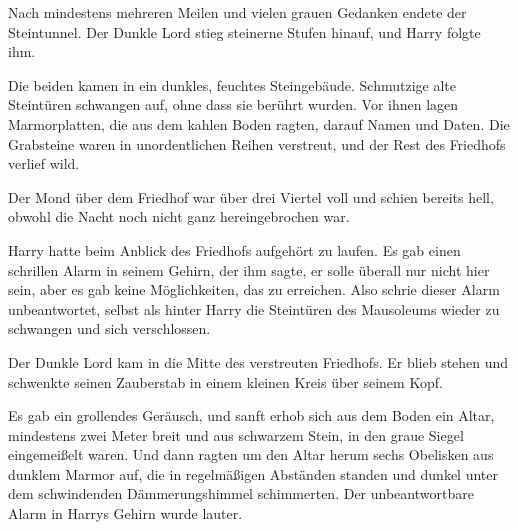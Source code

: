 Nach mindestens mehreren Meilen und vielen grauen Gedanken endete der Steintunnel.
Der Dunkle Lord stieg steinerne Stufen hinauf, und Harry folgte ihm.

Die beiden kamen in ein dunkles, feuchtes Steingebäude. Schmutzige alte Steintüren schwangen auf, ohne dass sie berührt wurden.
Vor ihnen lagen Marmorplatten, die aus dem kahlen Boden ragten, darauf Namen und Daten. Die Grabsteine waren in unordentlichen Reihen verstreut, und der Rest des Friedhofs verlief wild.

Der Mond über dem Friedhof war über drei Viertel voll und schien bereits hell, obwohl die Nacht noch nicht ganz hereingebrochen war.

Harry hatte beim Anblick des Friedhofs aufgehört zu laufen. Es gab einen schrillen Alarm in seinem Gehirn, der ihm sagte, er solle überall nur nicht hier sein, aber es gab keine Möglichkeiten, das zu erreichen. Also schrie dieser Alarm unbeantwortet, selbst als hinter Harry die Steintüren des Mausoleums wieder zu schwangen und sich verschlossen.

Der Dunkle Lord kam in die Mitte des verstreuten Friedhofs. Er blieb stehen und schwenkte seinen Zauberstab in einem kleinen Kreis über seinem Kopf.

Es gab ein grollendes Geräusch, und sanft erhob sich aus dem Boden ein Altar, mindestens zwei Meter breit und aus schwarzem Stein, in den graue Siegel eingemeißelt waren. Und dann ragten um den Altar herum sechs Obelisken aus dunklem Marmor auf, die in regelmäßigen Abständen standen und dunkel unter dem schwindenden Dämmerungshimmel schimmerten.
Der unbeantwortbare Alarm in Harrys Gehirn wurde lauter.

